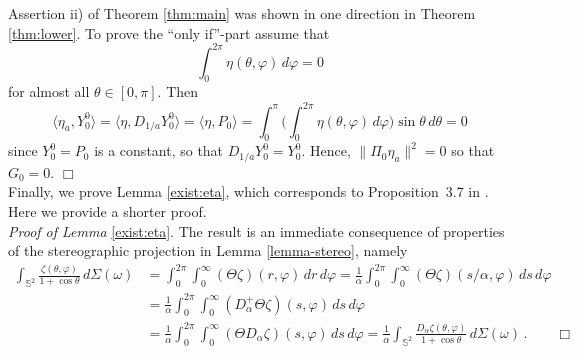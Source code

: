 \documentclass[a4paper,11pt,DIV=11,%
abstract=on%
]{scrartcl}
\newcommand{\red}[1]{#1}
\begin{document}
Assertion ii) of Theorem \ref{thm:main} was shown in one direction in Theorem \ref{thm:lower}.
\red{To prove the ``only if''-part  assume that
\[
 \int_0^{2\pi}\eta(\theta,\varphi)\,d\varphi=0
\]
for almost all $\theta\in [0,\pi]$. Then
\[
\langle\eta_a,Y_0^0\rangle=
\langle\eta,D_{1/a}Y_0^0\rangle=\langle\eta,P_0\rangle =
\int_0^\pi\bigl(\int_0^{2\pi}\eta(\theta,\varphi)\,d\varphi\bigr)\sin\theta\,d\theta=0
\]
since $Y_0^0=P_0$ is a constant, so that $D_{1/a}Y_0^0=Y_0^0$.  Hence, 
$\|\Pi_0\eta_a\|^2 =0$ so that $G_0=0$}. \hfill $\Box$
\\

\red{Finally, we prove Lemma \ref{exist:eta}, which corresponds to
  Proposition~3.7 in \cite{AV99}. Here we provide a shorter proof. }
\\

\emph{Proof of Lemma} \ref{exist:eta}.
	The result is an immediate consequence of properties of the stereographic projection in Lemma
	\ref{lemma-stereo}, namely
	\begin{align*}
		\int_{\mathbb S^2}\frac{\zeta(\theta,\varphi)}{1+\cos\theta}\,d\Sigma(\omega)
		&=\int_0^{2\pi}\int_0^\infty(\Theta\zeta)(r,\varphi)\,dr\,d\varphi
		=\frac1\alpha\int_0^{2\pi}\int_0^\infty(\Theta\zeta)(s/\alpha,\varphi)\,ds\,d\varphi\\
		&=\frac1\alpha\int_0^{2\pi}\int_0^\infty(D_\alpha^+\Theta\zeta)(s,\varphi)\,ds\,d\varphi\\
		&=\frac1\alpha\int_0^{2\pi}\int_0^\infty(\Theta D_\alpha\zeta)(s,\varphi)\,ds\,d\varphi
		=\frac1\alpha\int_{\mathbb S^2}\frac{D_\alpha\zeta(\theta,\varphi)}{1+\cos\theta}\,d\Sigma(\omega)\,.
		\qquad \Box
	\end{align*}


\appendix
\end{document}
